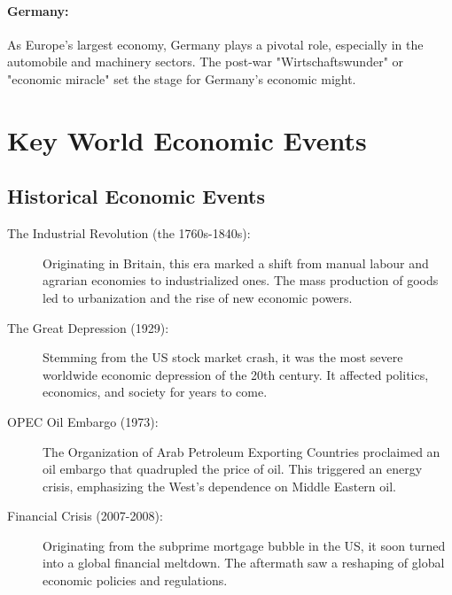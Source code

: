 \paragraph{Germany:}
As Europe's largest economy, Germany plays a pivotal role, especially in the automobile and machinery sectors. The post-war "Wirtschaftswunder" or "economic miracle" set the stage for Germany's economic might.

\section*{Key World Economic Events}

\subsection*{Historical Economic Events}
\begin{description}
    \item[The Industrial Revolution (the 1760s-1840s):] Originating in Britain, this era marked a shift from manual labour and agrarian economies to industrialized ones. The mass production of goods led to urbanization and the rise of new economic powers.
    \item[The Great Depression (1929):] Stemming from the US stock market crash, it was the most severe worldwide economic depression of the 20th century. It affected politics, economics, and society for years to come.
    \item[OPEC Oil Embargo (1973):] The Organization of Arab Petroleum Exporting Countries proclaimed an oil embargo that quadrupled the price of oil. This triggered an energy crisis, emphasizing the West's dependence on Middle Eastern oil.
    \item[Financial Crisis (2007-2008):] Originating from the subprime mortgage bubble in the US, it soon turned into a global financial meltdown. The aftermath saw a reshaping of global economic policies and regulations.
\end{description}

